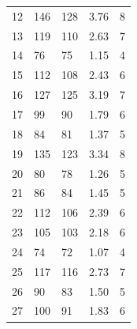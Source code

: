 \begin{table}[h!]
\begin{tabular}{|l|l|l|l|l|}
12              & 146                & 128                & 3.76                           & 8                                 \\
13              & 119                & 110                & 2.63                           & 7                                 \\
14              & 76                 & 75                 & 1.15                           & 4                                 \\
15              & 112                & 108                & 2.43                           & 6                                 \\
16              & 127                & 125                & 3.19                           & 7                                 \\
17              & 99                 & 90                 & 1.79                           & 6                                 \\
18              & 84                 & 81                 & 1.37                           & 5                                 \\
19              & 135                & 123                & 3.34                           & 8                                 \\
20              & 80                 & 78                 & 1.26                           & 5                                 \\
21              & 86                 & 84                 & 1.45                           & 5                                 \\
22              & 112                & 106                & 2.39                           & 6                                 \\
23              & 105                & 103                & 2.18                           & 6                                 \\
24              & 74                 & 72                 & 1.07                           & 4                                 \\
25              & 117                & 116                & 2.73                           & 7                                 \\
26              & 90                 & 83                 & 1.50                           & 5                                 \\
27              & 100                & 91                 & 1.83                           & 6                                 \\

\end{tabular}
\end{table}
